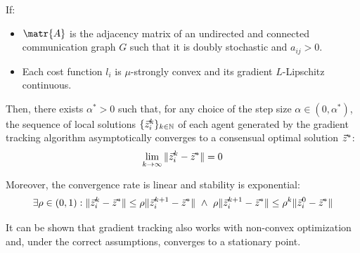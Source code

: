 \begin{description}



        \begin{theorem} 
            If:
            \begin{itemize}
                \item $\matr{A}$ is the adjacency matrix of an undirected and connected communication graph $G$ such that it is doubly stochastic and $a_{ij} > 0$.
                \item Each cost function $l_i$ is $\mu$-strongly convex and its gradient $L$-Lipschitz continuous.
            \end{itemize}
            Then, there exists $\alpha^* > 0$ such that, for any choice of the step size $\alpha \in (0, \alpha^*)$, the sequence of local solutions $\{ {\vec{z}}_i^k \}_{k \in \mathbb{N}}$ of each agent generated by the gradient tracking algorithm asymptotically converges to a consensual optimal solution ${\vec{z}}^*$:
            \[ \lim_{k \rightarrow \infty} \Vert {\vec{z}}_i^k - {\vec{z}}^* \Vert = 0 \]
            
            Moreover, the convergence rate is linear and stability is exponential:
            \[ 
                \exists \rho \in (0,1): \Vert {\vec{z}}_i^k - {\vec{z}}^* \Vert \leq \rho \Vert {\vec{z}}_i^{k+1} - {\vec{z}}^* \Vert
                \,\,\land\,\,
                \rho \Vert {\vec{z}}_i^{k+1} - {\vec{z}}^* \Vert \leq \rho^k \Vert {\vec{z}}_i^0 - {\vec{z}}^* \Vert
            \]
        \end{theorem}
\end{description}

\begin{remark}
    It can be shown that gradient tracking also works with non-convex optimization and, under the correct assumptions, converges to a stationary point. 
\end{remark}